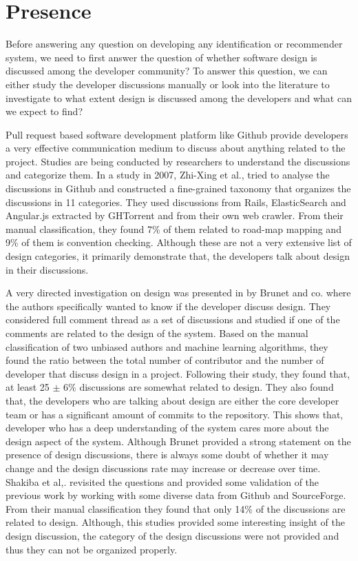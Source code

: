 \section{Presence}
\label{sect:presence}
Before answering any question on developing any identification or recommender system, we need to first answer the question of whether software design is discussed among the developer community? To answer this question, we can either study the developer discussions manually or look into the literature to investigate to what extent design is discussed among the developers and what can we expect to find? 

Pull request based software development platform like Github provide developers a very effective communication medium to discuss about anything related to the project. Studies are being conducted by researchers to understand the discussions and categorize them. In a study in 2007, Zhi-Xing et al.,\cite{Li2007} tried to analyse the discussions in Github and constructed a fine-grained taxonomy that organizes the discussions in 11 categories. They used discussions from Rails, ElasticSearch and Angular.js extracted by GHTorrent and from their own web crawler. From their manual classification, they found 7\% of them related to road-map mapping and 9\% of them is convention checking. Although these are not a very extensive list of design categories, it primarily demonstrate that, the developers talk about design in their discussions.

A very directed investigation on design was presented in \cite{Brunet2014a} by Brunet and co. where the authors specifically wanted to know if the developer discuss design. They considered full comment thread as a set of discussions and studied if one of the comments are related to the design of the system. Based on the manual classification of two unbiased authors and machine learning algorithms, they found the ratio between the total number of contributor and the number of developer that discuss design in a project. Following their study, they found that, at least 25 {$\pm$} 6\% discussions are somewhat related to design. They also found that, the developers who are talking about design are either the core developer team or has a significant amount of commits to the repository. This shows that, developer who has a deep understanding of the system cares more about the design aspect of the system. Although Brunet \cite{Brunet2014a} provided a strong statement on the presence of design discussions, there is always some doubt of whether it may change and the design discussions rate may increase or decrease over time. Shakiba et al,.\cite{Shakiba2016} revisited the questions and provided some validation of the previous work by working with some diverse data from Github and SourceForge. From their manual classification they found that only 14\% of the discussions are related to design. Although, this studies provided some interesting insight of the design discussion, the category of the design discussions were not provided and thus they can not be organized properly.

